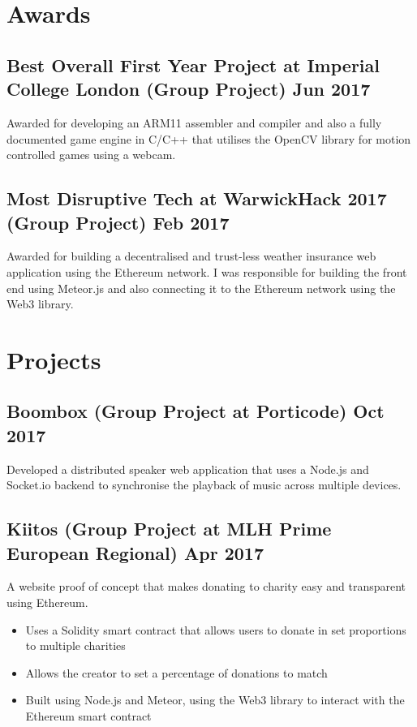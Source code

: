 \documentclass[a4paper]{article}
\begin{document}
\section*{Awards}

\subsection*{Best Overall First Year Project at Imperial College London \textnormal{(Group Project)} \hfill Jun 2017}

Awarded for developing an ARM11 assembler and compiler and also a fully documented game engine in C/C++ that utilises the OpenCV library for motion controlled games using a webcam.

\subsection*{Most Disruptive Tech at WarwickHack 2017 \textnormal{(Group Project)} \hfill Feb 2017}

Awarded for building a decentralised and trust-less weather insurance web application using the Ethereum network. I was responsible for building the front end using Meteor.js and also connecting it to the Ethereum network using the Web3 library.

\section*{Projects}

\subsection*{Boombox \textnormal{(Group Project at Porticode)} \hfill Oct 2017}

Developed a distributed speaker web application that uses a Node.js and Socket.io backend to synchronise the playback of music across multiple devices.

\subsection*{Kiitos \textnormal{(Group Project at MLH Prime European Regional)} \hfill Apr 2017}

A website proof of concept that makes donating to charity easy and transparent using Ethereum.

\begin{itemize}
    \item Uses a Solidity smart contract that allows users to donate in set proportions to multiple charities
    \item Allows the creator to set a percentage of donations to match
    \item Built using Node.js and Meteor, using the Web3 library to interact with the Ethereum smart contract
\end{itemize}
\end{document}
